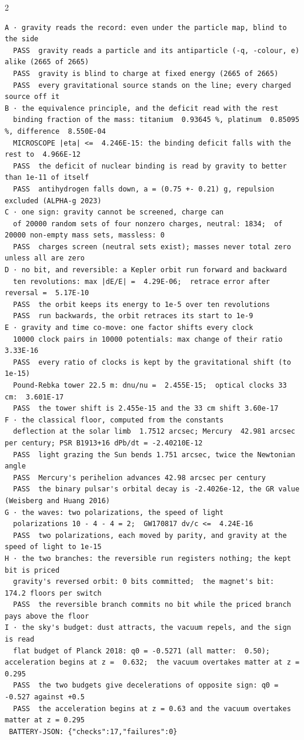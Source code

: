 \documentclass[10pt]{article}
\begin{document}
\begin{multicols}{2}
\begin{Verbatim}[fontsize=\fontsize{5.9}{6.8}\selectfont,breaklines,breakanywhere,breaksymbolleft={}]
A · gravity reads the record: even under the particle map, blind to the side
  PASS  gravity reads a particle and its antiparticle (-q, -colour, e) alike (2665 of 2665)
  PASS  gravity is blind to charge at fixed energy (2665 of 2665)
  PASS  every gravitational source stands on the line; every charged source off it
B · the equivalence principle, and the deficit read with the rest
  binding fraction of the mass: titanium  0.93645 %, platinum  0.85095 %, difference  8.550E-04
  MICROSCOPE |eta| <=  4.246E-15: the binding deficit falls with the rest to  4.966E-12
  PASS  the deficit of nuclear binding is read by gravity to better than 1e-11 of itself
  PASS  antihydrogen falls down, a = (0.75 +- 0.21) g, repulsion excluded (ALPHA-g 2023)
C · one sign: gravity cannot be screened, charge can
  of 20000 random sets of four nonzero charges, neutral: 1834;  of 20000 non-empty mass sets, massless: 0
  PASS  charges screen (neutral sets exist); masses never total zero unless all are zero
D · no bit, and reversible: a Kepler orbit run forward and backward
  ten revolutions: max |dE/E| =  4.29E-06;  retrace error after reversal =  5.17E-10
  PASS  the orbit keeps its energy to 1e-5 over ten revolutions
  PASS  run backwards, the orbit retraces its start to 1e-9
E · gravity and time co-move: one factor shifts every clock
  10000 clock pairs in 10000 potentials: max change of their ratio  3.33E-16
  PASS  every ratio of clocks is kept by the gravitational shift (to 1e-15)
  Pound-Rebka tower 22.5 m: dnu/nu =  2.455E-15;  optical clocks 33 cm:  3.601E-17
  PASS  the tower shift is 2.455e-15 and the 33 cm shift 3.60e-17
F · the classical floor, computed from the constants
  deflection at the solar limb  1.7512 arcsec; Mercury  42.981 arcsec per century; PSR B1913+16 dPb/dt = -2.40210E-12
  PASS  light grazing the Sun bends 1.751 arcsec, twice the Newtonian angle
  PASS  Mercury's perihelion advances 42.98 arcsec per century
  PASS  the binary pulsar's orbital decay is -2.4026e-12, the GR value (Weisberg and Huang 2016)
G · the waves: two polarizations, the speed of light
  polarizations 10 - 4 - 4 = 2;  GW170817 dv/c <=  4.24E-16
  PASS  two polarizations, each moved by parity, and gravity at the speed of light to 1e-15
H · the two branches: the reversible run registers nothing; the kept bit is priced
  gravity's reversed orbit: 0 bits committed;  the magnet's bit:  174.2 floors per switch
  PASS  the reversible branch commits no bit while the priced branch pays above the floor
I · the sky's budget: dust attracts, the vacuum repels, and the sign is read
  flat budget of Planck 2018: q0 = -0.5271 (all matter:  0.50);  acceleration begins at z =  0.632;  the vacuum overtakes matter at z =  0.295
  PASS  the two budgets give decelerations of opposite sign: q0 = -0.527 against +0.5
  PASS  the acceleration begins at z = 0.63 and the vacuum overtakes matter at z = 0.295
 BATTERY-JSON: {"checks":17,"failures":0}
\end{Verbatim}
\end{multicols}
\end{document}
